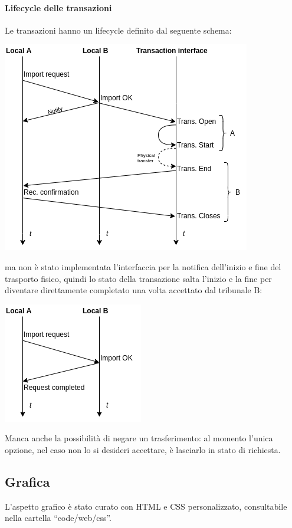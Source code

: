 {\paragraph{Lifecycle delle transazioni}
Le transazioni hanno un lifecycle definito dal seguente schema:
\begin{center}
    \includegraphics[scale=0.8]{images/tl.png}
\end{center}
ma non è stato implementata l'interfaccia per la notifica dell'inizio e fine del trasporto fisico, quindi lo stato della transazione salta l'inizio e la fine per diventare direttamente completato una volta accettato dal tribunale B:
\begin{center}
    \includegraphics[scale=0.8]{images/tl1.png}
\end{center}

Manca anche la possibilità di negare un trasferimento: al momento l'unica opzione, nel caso non lo si desideri accettare, è lasciarlo in stato di richiesta.

\subsection{Grafica}
L'aspetto grafico è stato curato con HTML e CSS personalizzato, consultabile nella cartella ``code/web/css''.

}
